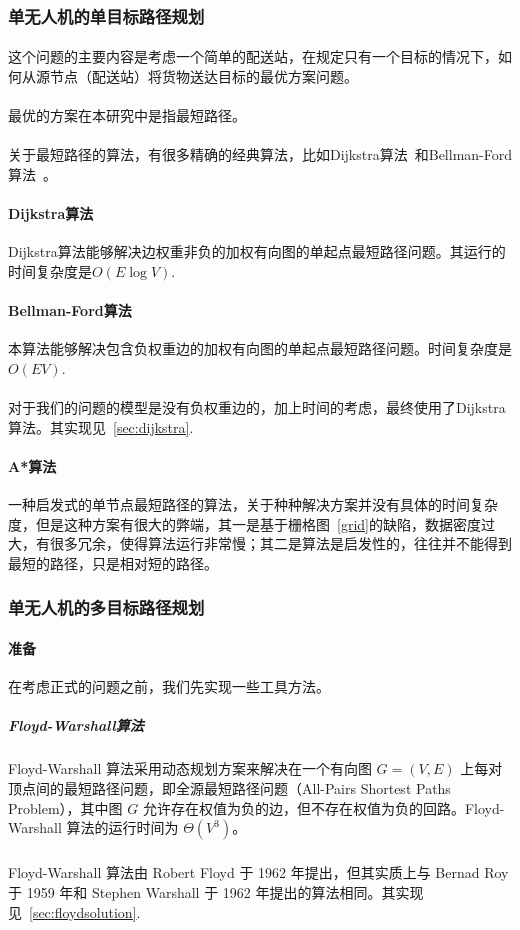 \documentclass[UTF8,a4paper]{ctexart}
\begin{document}
\subsubsection{单无人机的单目标路径规划}
\paragraph{}这个问题的主要内容是考虑一个简单的配送站，在规定只有一个目标的情况下，如何从源节点（配送站）将货物送达目标的最优方案问题。
\paragraph{}最优的方案在本研究中是指最短路径。
\paragraph{}关于最短路径的算法，有很多精确的经典算法，比如Dijkstra算法~\cite{felner2011position}和Bellman-Ford算法~\cite{bellman1958routing}。
\paragraph{Dijkstra算法}Dijkstra算法能够解决边权重非负的加权有向图的单起点最短路径问题。其运行的时间复杂度是$O(E\log{V})$.
\paragraph{Bellman-Ford算法}本算法能够解决包含负权重边的加权有向图的单起点最短路径问题。时间复杂度是$O(EV)$.
\paragraph{}对于我们的问题的模型是没有负权重边的，加上时间的考虑，最终使用了Dijkstra算法。其实现见~\ref{sec:dijkstra}.

\paragraph{A*算法}一种启发式的单节点最短路径的算法，关于种种解决方案并没有具体的时间复杂度，但是这种方案有很大的弊端，其一是基于栅格图~\ref{grid}的缺陷，数据密度过大，有很多冗余，使得算法运行非常慢；其二是算法是启发性的，往往并不能得到最短的路径，只是相对短的路径。~\cite{astarredbloggames}


\subsubsection{单无人机的多目标路径规划}
\paragraph{准备}在考虑正式的问题之前，我们先实现一些工具方法。
\subparagraph{Floyd-Warshall算法}Floyd-Warshall 算法采用动态规划方案来解决在一个有向图 $G = (V, E)$ 上每对顶点间的最短路径问题，即全源最短路径问题（All-Pairs Shortest Paths Problem），其中图 $G$ 允许存在权值为负的边，但不存在权值为负的回路。Floyd-Warshall 算法的运行时间为 $Θ(V^3)$。
\subparagraph{}Floyd-Warshall 算法由 Robert Floyd 于 1962 年提出，但其实质上与 Bernad Roy 于 1959 年和 Stephen Warshall 于 1962 年提出的算法相同。其实现见~\ref{sec:floydsolution}.
\end{document}
